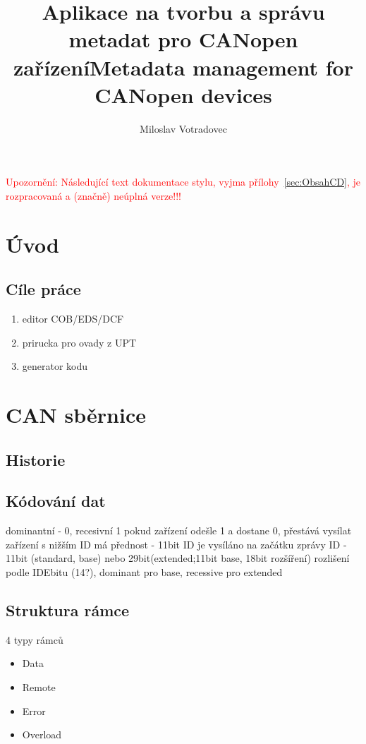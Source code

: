 \documentclass[
  field=ainfk,
  biblatex,
  glossaries,
  index
]{kidiplom}
\title{Aplikace na tvorbu a správu metadat pro CANopen zařízení}
\title[english]{Metadata management for CANopen devices}
\author{Miloslav Votradovec}
\begin{document}
\maketitle




\newcommand{\BibLaTeX}{\textsc{Bib}\LaTeX}

\noindent\textcolor{red}{\LARGE Upozornění: Následující text
  dokumentace stylu, vyjma přílohy~\ref{sec:ObsahCD}, je rozpracovaná
  a (značně) neúplná verze!!!}


\section{Úvod}
\subsection{Cíle práce}
\begin{enumerate}
    \item editor COB/EDS/DCF 
    \item prirucka pro ovady z UPT 
    \item generator kodu 
\end{enumerate}
\section{CAN sběrnice}
\subsection{Historie}
\subsection{Kódování dat}
dominantní - 0, recesivní 1
pokud zařízení odešle 1 a dostane 0, přestává vysílat
zařízení s nižším ID má přednost - 11bit ID je vysíláno na začátku zprávy
ID - 11bit (standard, base) nebo 29bit(extended;11bit base, 18bit rozšíření)
rozlišení podle IDEbitu (14?), dominant pro base, recessive pro extended
\subsection{Struktura rámce}
4 typy rámců
\begin{itemize}
	\item Data
	\item Remote
	\item Error
	\item Overload
\end{itemize}
\end{document}
